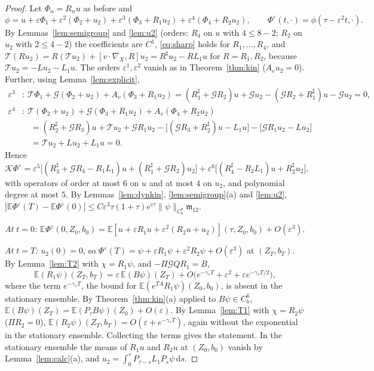 \documentclass[11pt]{article}
\newcommand{\dd}{\mathrm{d}}
\newcommand{\E}{\mathbb{E}}
\newcommand{\eps}{\varepsilon}
\newcommand{\cT}{\mathcal{T}}
\newcommand{\cG}{\mathcal{G}}
\newcommand{\cK}{\mathcal{K}}
\newcommand{\fm}{\mathfrak{m}}
\newcommand{\nrm}[2]{\|#1\|_{#2}}
\theoremstyle{remark}
\begin{document}
\begin{proof}
Let $\Phi_n=R_nu$ as before and
\[
  \phi=u+\eps\Phi_1+\eps^2(\Phi_2+u_2)+\eps^3(\Phi_3+R_1u_2)
     +\eps^4(\Phi_4+R_2u_2),\qquad \Phi^\eps(t,\cdot)=\phi(\tau-\eps^2t,\cdot).
\]
By Lemmas~\ref{lem:semigroup} and \ref{lem:u2} (orders: $R_4$ on $u$ with
$4\le8-2$; $R_2$ on $u_2$ with $2\le4-2$) the coefficients are $C^1$,
\eqref{eq:sharp} holds for $R_1,\dots,R_4$, and
$\cT(Ru_2)=R(\cT u_2)+[v\cdot\nabla_X,R]u_2=R^\sharp u_2-RL_1u$ for
$R=R_1,R_2$, because $\cT u_2=-Lu_2-L_1u$. The orders $\eps^1,\eps^2$
vanish as in Theorem~\ref{thm:kin} ($A_vu_2=0$). Further, using
Lemma~\ref{lem:explicit},
\begin{align*}
  \eps^3&:\ \cT\Phi_1+\cG(\Phi_2+u_2)+A_v(\Phi_3+R_1u_2)
     =(R_1^\sharp+\cG R_2)u+\cG u_2-(\cG R_2+R_1^\sharp)u-\cG u_2=0,\\
  \eps^4&:\ \cT(\Phi_2+u_2)+\cG(\Phi_3+R_1u_2)+A_v(\Phi_4+R_2u_2)\\
     &\quad=(R_2^\sharp+\cG R_3)u+\cT u_2+\cG R_1u_2
       -\bigl[(\cG R_3+R_2^\sharp)u-L_1u\bigr]-\bigl[\cG R_1u_2-Lu_2\bigr]\\
     &\quad=\cT u_2+Lu_2+L_1u=0 .
\end{align*}
Hence
\[
  \cK\Phi^\eps=\eps^5\bigl[(R_3^\sharp+\cG R_4-R_1L_1)u+(R_1^\sharp+\cG R_2)u_2\bigr]
  +\eps^6\bigl[(R_4^\sharp-R_2L_1)u+R_2^\sharp u_2\bigr],
\]
with operators of order at most $6$ on $u$ and at most $4$ on $u_2$, and
polynomial degree at most $5$. By Lemmas~\ref{lem:dynkin},
\ref{lem:semigroup}(a) and \ref{lem:u2},
$|\E\Phi^\eps(T)-\E\Phi^\eps(0)|\le C\eps^3\tau(1+\tau)e^{c\tau}
\nrm{\psi}{C_b^8}\fm_{12}$.

\emph{At $t=0$:} $\E\Phi^\eps(0,Z_0,b_0)=\E[u+\eps R_1u+\eps^2(R_2u+u_2)]
(\tau,Z_0,b_0)+O(\eps^3)$.

\emph{At $t=T$:} $u_2(0)=0$, so $\Phi^\eps(T)=\psi+\eps R_1\psi+\eps^2R_2\psi
+O(\eps^3)$ at $(Z_T,b_T)$. By Lemma~\ref{lem:T2} with $\chi=R_1\psi$, and
$-\Pi\cG QR_1=B$,
\[
  \E(R_1\psi)(Z_T,b_T)=\eps\,\E(B\psi)(Z_T)
   +O\bigl(e^{-\gamma_*T}+\eps^2+\eps e^{-\gamma_*T/2}\bigr),
\]
where the term $e^{-\gamma_*T}$, the bound for $\E(e^{TA}R_1\psi)(Z_0,b_0)$,
is absent in the stationary ensemble. By Theorem~\ref{thm:kin}(a) applied to
$B\psi\in C_b^6$, $\E(B\psi)(Z_T)=\E(P_\tau B\psi)(Z_0)+O(\eps)$. By
Lemma~\ref{lem:T1} with $\chi=R_2\psi$ ($\Pi R_2=0$),
$\E(R_2\psi)(Z_T,b_T)=O(\eps+e^{-\gamma_*T})$, again without the exponential
in the stationary ensemble. Collecting the terms gives the statement. In
the stationary ensemble the means of $R_1u$ and $R_2u$ at $(Z_0,b_0)$ vanish
by Lemma~\ref{lem:calc}(a), and $u_2=\int_0^\tau P_{\tau-s}L_1P_s\psi\,\dd s$.
\end{proof}
\end{document}
